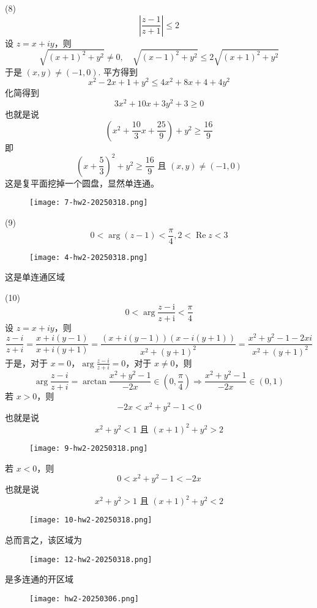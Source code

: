 (8)
\[
\left|\frac{z-1}{z+1}\right| \leqslant 2 
\]
设 $z=x+iy$，则
\[
\sqrt{ (x+1)^{2}+y^{2} }\neq 0,\quad \sqrt{ (x-1)^{2}+y^{2} }\leq 2\sqrt{ (x+1)^{2}+y^{2} }
\]
于是 $(x,y)\neq(-1,0)$. 平方得到
\[
x^{2}-2x+1+y^{2}\leq4x^{2}+8x+4+4y^{2}
\]
化简得到
\[
3x^{2}+10x+3y^{2}+3\geq 0
\]
也就是说
\[
\left( x^{2}+\frac{10}{3}x+\frac{25}{9} \right)+y^{2}\geq \frac{16}{9}
\]
即
\[
\left( x+\frac{5}{3} \right)^{2}+y^{2}\geq  \frac{16}{9}\text{ 且 }(x,y)\neq (-1,0)
\]
这是复平面挖掉一个圆盘，显然单连通。
\begin{figure}[H]
\centering
\texttt{[image: 7-hw2-20250318.png]}
\label{}
\end{figure}

(9)
\[
0<\arg (z-1)<\frac{\pi}{4}, 2<\operatorname{Re} z<3
\]
\begin{figure}[H]
\centering
\texttt{[image: 4-hw2-20250318.png]}
\label{}
\end{figure}

这是单连通区域

(10)
\[
0<\arg \frac{z-\mathrm{i}}{z+\mathrm{i}}<\frac{\pi}{4}
\]
设 $z=x+iy$，则
\[
\frac{z-i}{z+i}=\frac{x+i(y-1)}{x+i(y+1)}=\frac{(x+i(y-1))(x-i(y+1))}{x^{2}+(y+1)^{2}}=\frac{x^{2}+y^{2}-1-2xi}{x^{2}+(y+1)^{2}}
\]
于是，对于 $x=0$，$\arg\frac{z-i}{z+i}=0$，对于 $x\neq0$，则
\[
\arg\frac{z-i}{z+i}=\arctan\frac{x^{2}+y^{2}-1}{-2x}\in\left( 0,\frac{\pi}{4} \right)\Rightarrow\frac{x^{2}+y^{2}-1}{-2x}\in(0,1)
\]
若 $x>0$，则
\[
-2x<x^{2}+y^{2}-1<0
\]
也就是说
\[
x^{2}+y^{2}<1\text{ 且 }(x+1)^{2}+y^{2}>2
\]
\begin{figure}[H]
\centering
\texttt{[image: 9-hw2-20250318.png]}
\label{}
\end{figure}

若 $x<0$，则
\[
0<x^{2}+y^{2}-1<-2x
\]
也就是说
\[
x^{2}+y^{2}>1\text{ 且 }(x+1)^{2}+y^{2}<2
\]
\begin{figure}[H]
\centering
\texttt{[image: 10-hw2-20250318.png]}
\label{}
\end{figure}

总而言之，该区域为

\begin{figure}[H]
\centering
\texttt{[image: 12-hw2-20250318.png]}
\label{}
\end{figure}

是多连通的开区域

\begin{figure}[H]
\centering
\texttt{[image: hw2-20250306.png]}
\label{}
\end{figure}


